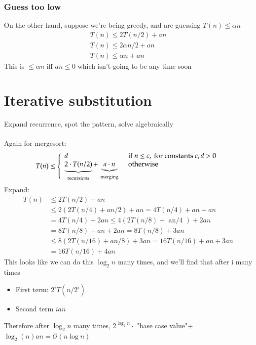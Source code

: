 \documentclass{article}[18pt]
\begin{document}
\subsubsection{Guess too low}
On the other hand, suppose we're being greedy, and are guessing $T(n)\leqslant \alpha n$
$$\begin{array} { l } { T ( n ) \leq 2 T ( n / 2 ) + a n } \\ { T ( n ) \leq 2 \alpha n / 2 + a n } \\ { T ( n ) \leq \alpha n + a n } \end{array}$$
This is $\leqslant \alpha n$ iff $an\leqslant 0$ which isn't going to be any time soon
\section{Iterative substitution}
Expand recurrence, spot the pattern, solve algebraically\\
\\
Again for mergesort:
$$T ( n ) \leq \left\{ \begin{array} { l l } { d } & { \text { if } n \leq c , \text { for constants } c , d > 0 } \\ { \underbrace { 2 \cdot T ( n / 2 ) } _ { \text { recursions } } + \underbrace { a \cdot n } _ { \text { merging } } } & { \text { otherwise } } \end{array} \right.$$
Expand:
$$\begin{aligned} T ( n ) & \leq 2 T ( n / 2 ) + a n \\ & \leq 2 ( 2 T ( n / 4 ) + a n / 2 ) + a n = 4 T ( n / 4 ) + a n + a n \\ & = 4 T ( n / 4 ) + 2 a n \leq 4 ( 2 T ( n / 8 ) + \text { an/4 } ) + 2 a n \\ & = 8 T ( n / 8 ) + a n + 2 a n = 8 T ( n / 8 ) + 3 a n \\ & \leq 8 ( 2 T ( n / 16 ) + a n / 8 ) + 3 a n = 16 T ( n / 16 ) + a n + 3 a n \\ & = 16 T ( n / 16 ) + 4 a n \end{aligned}$$
This looks like we can do this $\log_2n$ many times, and we'll find that after i many times
\begin{itemize}
	\item First term: $2^iT(n/2^i)$
	\item Second term $ian$
\end{itemize}
Therefore after $\log_2n$ many times,
$2^{\log_2n}\cdot$ "base case value"+$\log_2(n)an=\mathcal{O}(n\log n)$
\end{document}

